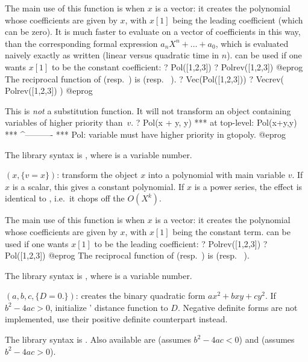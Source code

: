 The main use of this function is when $x$ is a vector: it creates the
polynomial whose coefficients are given by $x$, with $x[1]$ being the leading
coefficient (which can be zero). It is much faster to evaluate
 on a vector of coefficients in this way, than the corresponding
formal expression $a_n X^n + \dots + a_0$, which is evaluated naively exactly
as written (linear versus quadratic time in $n$).  can be used if
one wants $x[1]$ to be the constant coefficient:
\bprog
? Pol([1,2,3])
? Polrev([1,2,3])
@eprog\noindent
The reciprocal function of  (resp.~) is  (resp.~
).
\bprog
? Vec(Pol([1,2,3]))
? Vecrev( Polrev([1,2,3]) )
@eprog\noindent

 This is \emph{not} a substitution function. It will not
transform an object containing variables of higher priority than~$v$.
\bprog
? Pol(x + y, y)
  ***   at top-level: Pol(x+y,y)
  ***                 ^----------
  *** Pol: variable must have higher priority in gtopoly.
@eprog

The library syntax is , where  is a variable number.

$(x,\{v=x\})$: \label{se:Polrev}
transform the object $x$ into a polynomial
with main variable $v$. If $x$ is a scalar, this gives a constant polynomial.
If $x$ is a power series, the effect is identical to , i.e.~it
chops off the $O(X^k)$.

The main use of this function is when $x$ is a vector: it creates the
polynomial whose coefficients are given by $x$, with $x[1]$ being the
constant term.  can be used if one wants $x[1]$ to be the leading
coefficient:
\bprog
? Polrev([1,2,3])
? Pol([1,2,3])
@eprog
The reciprocal function of  (resp.~) is  (resp.~
).

The library syntax is , where  is a variable number.

$(a,b,c,\{D=0.\})$: \label{se:Qfb}creates the binary quadratic form
$ax^2+bxy+cy^2$. If $b^2-4ac>0$, initialize ' distance
function to $D$. Negative definite forms are not implemented,
use their positive definite counterpart instead.

The library syntax is .
Also available are
 (assumes $b^2-4ac<0$) and
 (assumes $b^2-4ac>0$).


